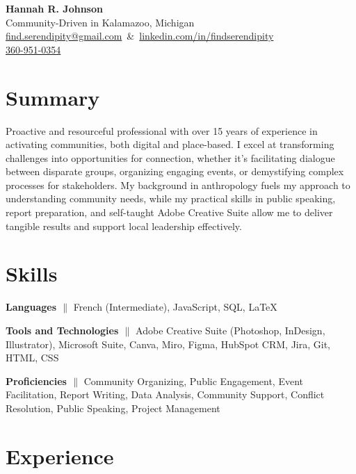 \documentclass[a4paper,12pt]{article} %
\begin{document}
      \begin{center} %
      {\LARGE \textbf{Hannah R. Johnson}} \\
      Community-Driven in Kalamazoo, Michigan \\
      \mbox{\href{mailto:find.serendipity@gmail.com}{find.serendipity@gmail.com} \&
            \href{https://www.linkedin.com/in/findserendipity/}{linkedin.com/in/findserendipity}}\\
      \href{tel:360-951-0354}{360-951-0354}

\end{center}

\section{Summary }
\noindent
Proactive and resourceful professional with over 15 years of experience in activating communities, both digital and place-based. I excel at transforming challenges into opportunities for connection, whether it's facilitating dialogue between disparate groups, organizing engaging events, or demystifying complex processes for stakeholders. My background in anthropology fuels my approach to understanding community needs, while my practical skills in public speaking, report preparation, and self-taught Adobe Creative Suite allow me to deliver tangible results and support local leadership effectively.

\section{Skills}
\textbf{Languages {$\parallel$}} \small{{ French (Intermediate), JavaScript, SQL, LaTeX }} %

\textbf{Tools and Technologies {$\parallel$}} \small{{ Adobe Creative Suite (Photoshop, InDesign, Illustrator), Microsoft Suite, Canva, Miro, Figma, HubSpot CRM, Jira, Git, HTML, CSS }} %

\textbf{Proficiencies {$\parallel$}} \small{{ Community Organizing, Public Engagement, Event Facilitation, Report Writing, Data Analysis, Community Support, Conflict Resolution, Public Speaking, Project Management }} %
\section{Experience}
\end{document}
